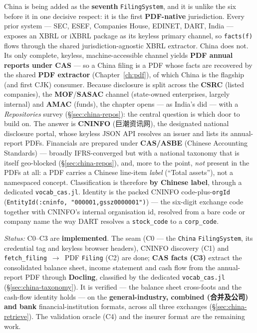 \documentclass[11pt,a4paper]{report}
\newcommand{\cncjk}[2]{{\cjkCNfont #1}}
\begin{document}
China is being added as the \textbf{seventh} \texttt{FilingSystem}, and it is unlike the six before it in
one decisive respect: it is the first \textbf{PDF-native} jurisdiction. Every prior system --- SEC, ESEF,
Companies House, EDINET, DART, India --- exposes an XBRL or iXBRL package as its keyless primary channel,
so \texttt{facts(f)} flows through the shared jurisdiction-agnostic XBRL extractor. China does not. Its only
complete, keyless, machine-accessible channel yields \textbf{PDF annual reports under CAS} --- so a China
filing is a PDF whose facts are recovered by the shared \textbf{PDF extractor} (Chapter~\ref{ch:pdf}), of
which China is the flagship (and first CJK) consumer. Because disclosure is split across the \textbf{CSRC}
(listed companies), the \textbf{MOF}/\textbf{SASAC} channel (state-owned enterprises, largely internal) and
\textbf{AMAC} (funds), the chapter opens --- as India's did --- with a \emph{Repositories} survey
(\S\ref{sec:china-repos}): the central question is which door to build on. The answer is
\textbf{CNINFO} (\cncjk{巨潮资讯网}{}), the designated national disclosure portal,
whose keyless JSON API resolves an issuer and lists its annual-report PDFs. Financials are prepared under
\textbf{CAS/ASBE} (Chinese Accounting Standards) --- broadly
IFRS-converged but with a national taxonomy that is itself geo-blocked (\S\ref{sec:china-repos}), and, more
to the point, \emph{not} present in the PDFs at all: a PDF carries a Chinese line-item \emph{label}
(``Total assets''), not a namespaced concept. Classification is
therefore \textbf{by Chinese label}, through a dedicated \texttt{vocab\_cas.jl}. Identity is the
packed CNINFO code-plus-\texttt{orgId} (\texttt{EntityId(:cninfo, "000001,gssz0000001")}) --- the six-digit
exchange code together with CNINFO's internal organisation id, resolved from a bare code or company name the
way DART resolves a \texttt{stock\_code} to a \texttt{corp\_code}.

\emph{Status:} C0--C3 are \textbf{implemented}. The seam (C0 --- the \texttt{China} \texttt{FilingSystem},
its credential tag and keyless browser headers), CNINFO discovery (C1) and \texttt{fetch\_filing}~$\to$~PDF
\texttt{Filing} (C2) are done; \textbf{CAS facts (C3)} extract the consolidated balance sheet, income
statement and cash flow from the annual-report PDF through \textbf{Docling}, classified by the dedicated
\texttt{vocab\_cas.jl} (\S\ref{sec:china-taxonomy}). It is verified --- the balance sheet cross-foots and the
cash-flow identity holds --- on the \textbf{general-industry, combined (合并及公司) and bank}
financial-institution formats, across all three exchanges (\S\ref{sec:china-retrieve}). The validation
oracle (C4) and the insurer format are the remaining work.
\end{document}
